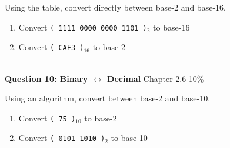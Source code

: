 \documentclass[a4paper,12pt]{book}
\begin{document}
Using the table, convert directly between base-2 and base-16.

\begin{enumerate}
	\item	Convert \texttt{( 1111 0000 0000 1101 )}$_{2} $ to base-16
	\item	Convert \texttt{( CAF3 )}$_{16} $ to base-2
\end{enumerate}

\newpage

~\\
\textbf{Question 10: Binary $ \leftrightarrow $ Decimal}
\hfill
Chapter 2.6
\hfill
10\%

Using an algorithm, convert between base-2 and base-10.

\begin{enumerate}
	\item	Convert \texttt{( 75 )}$_{10} $ to base-2
	\item	Convert \texttt{( 0101 1010 )}$_{2} $ to base-10
\end{enumerate}


\end{document}
